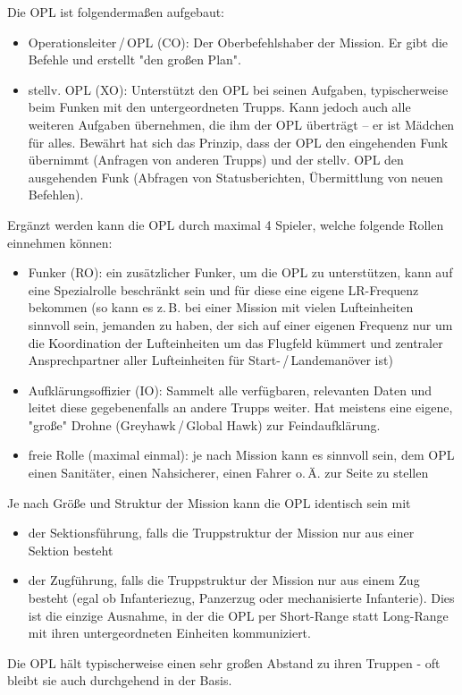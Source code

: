 Die \ac{OPL} ist folgendermaßen aufgebaut:
\begin{itemize}
	\item Operationsleiter\,/\,\acs{OPL} (\acf{CO}): Der Oberbefehlshaber der Mission. Er gibt die Befehle und erstellt "den großen Plan".
	\item stellv. \ac{OPL} (\acf{XO}): Unterstützt den \ac{OPL} bei seinen Aufgaben, typischerweise beim Funken mit den untergeordneten Trupps. Kann jedoch auch alle weiteren Aufgaben übernehmen, die ihm der \ac{OPL} überträgt -- er ist Mädchen für alles. Bewährt hat sich das Prinzip, dass der \ac{OPL} den eingehenden Funk übernimmt (Anfragen von anderen Trupps) und der stellv. \ac{OPL} den ausgehenden Funk (Abfragen von Statusberichten, Übermittlung von neuen Befehlen).
\end{itemize}
Ergänzt werden kann die \ac{OPL} durch maximal 4 Spieler, welche folgende Rollen einnehmen können:
\begin{itemize}
	\item Funker (\acf{RO}): ein zusätzlicher Funker, um die \ac{OPL} zu unterstützen, kann auf eine Spezialrolle beschränkt sein und für diese eine eigene LR-Frequenz bekommen (so kann es z.\,B. bei einer Mission mit vielen Lufteinheiten sinnvoll sein, jemanden zu haben, der sich auf einer eigenen Frequenz nur um die Koordination der Lufteinheiten um das Flugfeld kümmert und zentraler Ansprechpartner aller Lufteinheiten für Start-\,/\,Landemanöver ist)
	\item Aufklärungsoffizier (\acf{IO}): Sammelt alle verfügbaren, relevanten Daten und leitet diese gegebenenfalls an andere Trupps weiter. Hat meistens eine eigene, "große" Drohne (Greyhawk\,/\,Global Hawk) zur Feindaufklärung.
	\item freie Rolle (maximal einmal): je nach Mission kann es sinnvoll sein, dem \ac{OPL} einen Sanitäter, einen Nahsicherer, einen Fahrer o.\,Ä. zur Seite zu stellen
\end{itemize}
Je nach Größe und Struktur der Mission kann die \ac{OPL} identisch sein mit
\begin{itemize}
	\item der Sektionsführung, falls die Truppstruktur der Mission nur aus einer Sektion besteht
	\item der Zugführung, falls die Truppstruktur der Mission nur aus einem Zug besteht (egal ob Infanteriezug, Panzerzug oder mechanisierte Infanterie). Dies ist die einzige Ausnahme, in der die \ac{OPL} per Short-Range statt Long-Range mit ihren untergeordneten Einheiten kommuniziert.
\end{itemize}
Die OPL hält typischerweise einen sehr großen Abstand zu ihren Truppen - oft bleibt sie auch durchgehend in der Basis.
